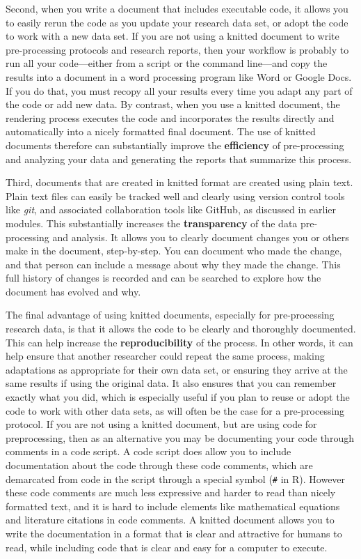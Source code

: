 \documentclass[]{tufte-book}
\begin{document}
Second, when you write a document that includes executable code, it allows you
to easily rerun the code as you update your research data set, or adopt the code
to work with a new data set. If you are not using a knitted document to write
pre-processing protocols and research reports, then your workflow is probably to
run all your code---either from a script or the command line---and copy the
results into a document in a word processing program like Word or Google Docs.
If you do that, you must recopy all your results every time you adapt any part
of the code or add new data. By contrast, when you use a knitted document, the
rendering process executes the code and incorporates the results directly and
automatically into a nicely formatted final document. The use of knitted
documents therefore can substantially improve the \textbf{efficiency} of
pre-processing and analyzing your data and generating the reports that summarize
this process.

Third, documents that are created in knitted format are created using plain
text. Plain text files can easily be tracked well and clearly using version
control tools like \emph{git}, and associated collaboration tools like GitHub, as
discussed in earlier modules. This substantially increases the \textbf{transparency}
of the data pre-processing and analysis. It allows you to clearly document
changes you or others make in the document, step-by-step. You can document who
made the change, and that person can include a message about why they made the
change. This full history of changes is recorded and can be searched to explore
how the document has evolved and why.

The final advantage of using knitted documents, especially for pre-processing
research data, is that it allows the code to be clearly and thoroughly
documented. This can help increase the \textbf{reproducibility} of the process. In
other words, it can help ensure that another researcher could repeat the same
process, making adaptations as appropriate for their own data set, or ensuring
they arrive at the same results if using the original data. It also ensures that
you can remember exactly what you did, which is especially useful if you plan to
reuse or adopt the code to work with other data sets, as will often be the case
for a pre-processing protocol. If you are not using a knitted document, but are
using code for preprocessing, then as an alternative you may be documenting your
code through comments in a code script. A code script does allow you to include
documentation about the code through these code comments, which are demarcated
from code in the script through a special symbol (\texttt{\#} in R). However these code
comments are much less expressive and harder to read than nicely formatted text,
and it is hard to include elements like mathematical equations and literature
citations in code comments. A knitted document allows you to write the
documentation in a format that is clear and attractive for humans to read, while
including code that is clear and easy for a computer to execute.
\end{document}
